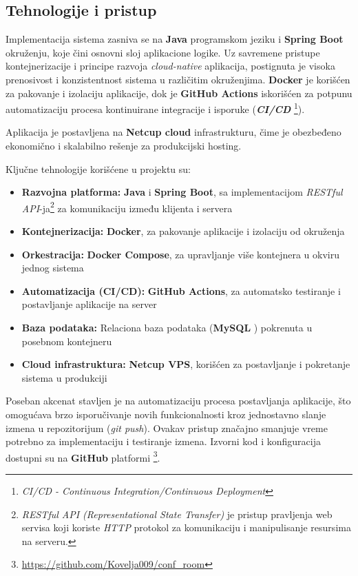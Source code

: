 \documentclass[12pt]{article}
\begin{document}
    \subsection{Tehnologije i pristup}

    Implementacija sistema zasniva se na \textbf{Java} \cite{java_language} programskom jeziku 
    i \textbf{Spring Boot} \cite{spring_boot} 
    okruženju, koje čini osnovni sloj aplikacione logike. Uz savremene pristupe 
    kontejnerizacije i principe razvoja \textit{cloud-native} aplikacija, postignuta je 
    visoka prenosivost i konzistentnost sistema u različitim okruženjima. \textbf{Docker} \cite{docker} je 
    korišćen za pakovanje i izolaciju aplikacije, dok je \textbf{GitHub Actions} \cite{github} iskorišćen 
    za potpunu automatizaciju procesa kontinuirane integracije i isporuke (\textbf{\textit{CI/CD}} \footnote{\textit{CI/CD - Continuous Integration/Continuous Deployment}}).

    Aplikacija je postavljena na \textbf{Netcup cloud} \cite{netcup} infrastrukturu, čime je obezbeđeno ekonomično i 
    skalabilno rešenje za produkcijski hosting.

    Ključne tehnologije korišćene u projektu su:
    \begin{itemize}
    \item \textbf{Razvojna platforma:} \textbf{Java} i \textbf{Spring Boot}, sa implementacijom \textit{RESTful API}-ja\footnote{\textit{RESTful API (Representational State Transfer)} je pristup pravljenja web servisa koji koriste \textit{HTTP} protokol za komunikaciju i manipulisanje resursima na serveru.}
 za komunikaciju između klijenta i servera
    \item \textbf{Kontejnerizacija:} \textbf{Docker}, za pakovanje aplikacije i izolaciju od okruženja  
    \item \textbf{Orkestracija:} \textbf{Docker Compose}, za upravljanje više kontejnera u okviru jednog sistema  
    \item \textbf{Automatizacija (CI/CD):} \textbf{GitHub Actions}, za automatsko testiranje i postavljanje aplikacije na server  
    \item \textbf{Baza podataka:} Relaciona baza podataka (\textbf{MySQL} \cite{mysql}) pokrenuta u posebnom kontejneru  
    \item \textbf{Cloud infrastruktura:} \textbf{Netcup VPS}, korišćen za postavljanje i pokretanje sistema u produkciji
    \end{itemize}
    
    Poseban akcenat stavljen je na automatizaciju procesa postavljanja aplikacije, 
    što omogućava brzo isporučivanje novih funkcionalnosti kroz jednostavno slanje izmena u 
    repozitorijum (\textit{git push}). Ovakav pristup značajno smanjuje vreme potrebno za 
    implementaciju i testiranje izmena.
    Izvorni kod i konfiguracija dostupni su na \textbf{GitHub} platformi \footnote{\url{https://github.com/Kovelja009/conf_room}}.
\end{document}
